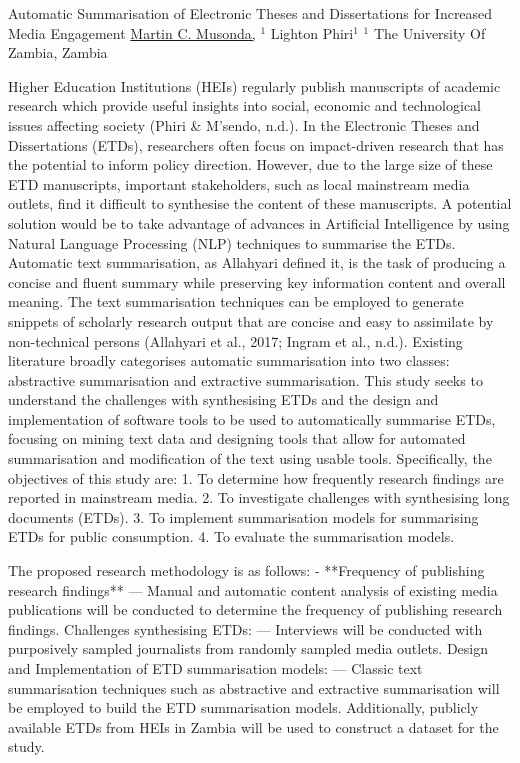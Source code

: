 \begin{abstract_online}{Automatic Summarisation of Electronic Theses and Dissertations for Increased Media Engagement}{%
    \underline{Martin C. Musonda,} $^{1}$ Lighton Phiri$^{1}$}{%
    }{%
    $^1$ The University Of Zambia, Zambia}
    
Higher Education Institutions (HEIs) regularly publish manuscripts of academic research which provide useful insights into social, economic and technological issues affecting society (Phiri & M’sendo, n.d.). In the Electronic Theses and Dissertations (ETDs), researchers often focus on impact-driven research that has the potential to inform policy direction. However, due to the large size of these ETD manuscripts, important stakeholders, such as local mainstream media outlets, find it difficult to synthesise the content of these manuscripts. A potential solution would be to take advantage of advances in Artificial Intelligence by using Natural Language Processing (NLP) techniques to summarise the ETDs. Automatic text summarisation, as Allahyari defined it, is the task of producing a concise and fluent summary while preserving key information content and overall meaning. The text summarisation techniques can be employed to generate snippets of scholarly research output that are concise and easy to assimilate by non-technical persons (Allahyari et al., 2017; Ingram et al., n.d.). Existing literature broadly categorises automatic summarisation into two classes: abstractive summarisation and extractive summarisation. This study seeks to understand the challenges with synthesising ETDs and the design and implementation of software tools to be used to automatically summarise ETDs, focusing on mining text data and designing tools that allow for automated summarisation and modification of the text using usable tools. Specifically, the objectives of this study are: 
1. To determine how frequently research findings are reported in mainstream media. 
2. To investigate challenges with synthesising long documents (ETDs). 
3. To implement summarisation models for summarising ETDs for public consumption. 
4. To evaluate the summarisation models. 

The proposed research methodology is as follows:
- **Frequency of publishing research findings** — Manual and automatic content analysis of existing media publications will be conducted to determine the frequency of publishing research findings. 
Challenges synthesising ETDs: — Interviews will be conducted with purposively sampled journalists from randomly sampled media outlets. 
Design and Implementation of ETD summarisation models: — Classic text summarisation techniques such as abstractive and extractive summarisation will be employed to build the ETD summarisation models. Additionally, publicly available ETDs from HEIs in Zambia will be used to construct a dataset for the study. 


\end{abstract_online}
